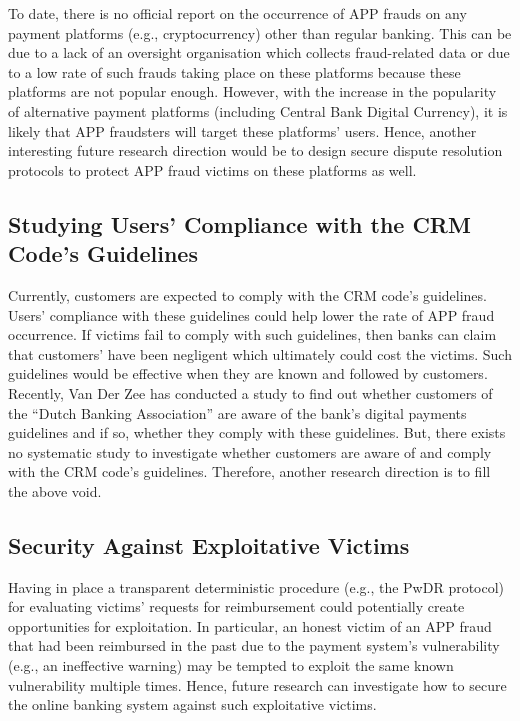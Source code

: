 To date, there is no official report on the occurrence of APP frauds on any payment platforms (e.g., cryptocurrency) other than regular banking. This can be due to a lack of an oversight organisation which collects fraud-related data or due to a low rate of such frauds taking place on these platforms because these platforms are not popular enough. However,  with the increase in the popularity of alternative payment platforms (including Central Bank Digital Currency), it is likely that APP fraudsters will target these platforms' users. Hence, another interesting future research direction would be to design secure dispute resolution protocols to protect  APP fraud victims on these platforms as well. 

\subsection{Studying Users' Compliance with the CRM Code's Guidelines}

Currently,  customers are expected to comply with the CRM code's guidelines.  Users'  compliance with these guidelines could help lower the rate of APP fraud occurrence.  If victims fail to comply with such guidelines, then banks can claim that customers' have been negligent which ultimately could cost the victims. Such guidelines would be effective when they are known and followed by customers. Recently, Van Der Zee \cite{zee2021shifting}  has conducted a study to find out whether customers of the ``Dutch Banking Association'' are aware of the bank's digital payments guidelines and if so, whether they comply with these guidelines.  But, there exists no systematic study to investigate whether customers are aware of and comply with the CRM code's guidelines. Therefore, another research direction is to fill the above void. 



\subsection{Security Against Exploitative Victims}



Having in place a transparent deterministic procedure (e.g.,  the PwDR protocol)  for evaluating victims' requests for reimbursement could potentially create opportunities for exploitation. In particular, an honest victim of an APP fraud that had been reimbursed in the past due to the payment system's vulnerability (e.g., an ineffective warning) may be tempted to exploit the same known vulnerability multiple times. Hence, future research can investigate how to secure the online banking system against such exploitative victims.











